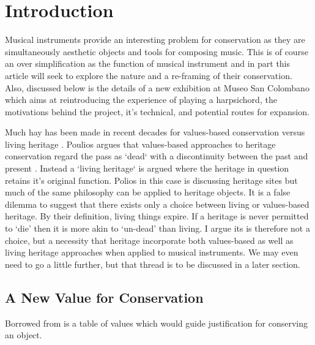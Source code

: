 

\section{Introduction}

Musical instruments provide an interesting problem for conservation as they are simultaneously aesthetic objects and tools for composing music.
This is  of course an over simplification as the function of musical instrument and in part this article will seek to explore the nature and a re-framing of their conservation. 
Also, discussed below is the details of a new exhibition at Museo San Colombano which aims at reintroducing the experience of playing a harpsichord, the motivations behind the project, it's technical, and potential routes for expansion.

Much hay has been made in recent decades for  values-based conservation versus living heritage \cite{poulios_moving_2010}.
Poulios argues that values-based approaches to heritage conservation regard the pass as `dead` with a discontinuity between the past and present \cite{poulios}. 
Instead a `living heritage` is argued where the heritage in question retains it's original function. Polios in this  case is discussing heritage sites but much of the same philosophy can be applied to  heritage objects. 
It is a false dilemma to suggest that there exists only a choice between living or values-based heritage.
By their definition, living things expire. If a heritage is never permitted to `die' then it is more akin to `un-dead' than living.
I argue its is therefore not a choice, but a necessity that heritage incorporate both values-based as well as living heritage approaches when applied to musical instruments. 
We may even need to go a little further, but that thread is to be discussed in a later section.


\subsection{A New Value for Conservation}

Borrowed from \cite{avrami_values_2000} is a table of values which would guide justification for conserving an object.

